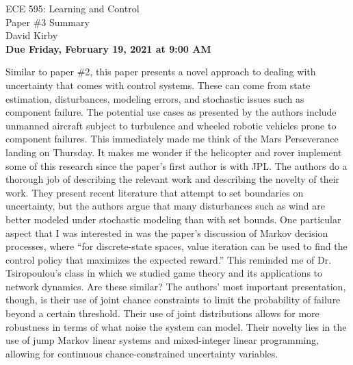 \documentclass[11pt]{article}
\begin{document}
\begin{center}
\LARGE{ECE 595: Learning and Control\\Paper \#3 Summary}\\[1.5em]
\large David Kirby\\[1.5em]
\large \textbf{Due Friday, February 19, 2021 at 9:00 AM}\\[2.5em]
\end{center}

\noindent Similar to paper \#2, this paper presents a novel approach to dealing with uncertainty that comes with control systems. These can come from state estimation, disturbances, modeling errors, and stochastic issues such as component failure. The potential use cases as presented by the authors include unmanned aircraft subject to turbulence and wheeled robotic vehicles prone to component failures. This immediately made me think of the Mars Perseverance landing on Thursday. It makes me wonder if the helicopter and rover implement some of this research since the paper's first author is with JPL. The authors do a thorough job of describing the relevant work and describing the novelty of their work. They present recent literature that attempt to set boundaries on uncertainty, but the authors argue that many disturbances such as wind are better modeled under stochastic modeling than with set bounds. One particular aspect that I was interested in was the paper's discussion of Markov decision processes, where ``for discrete-state spaces, value iteration can be used to find the control policy that maximizes the expected reward.'' This reminded me of Dr. Tsiropoulou's class in which we studied game theory and its applications to network dynamics. Are these similar? The authors' most important presentation, though, is their use of joint chance constraints to limit the probability of failure beyond a certain threshold. Their use of joint distributions allows for more robustness in terms of what noise the system can model. Their novelty lies in the use of jump Markov linear systems and mixed-integer linear programming, allowing for continuous chance-constrained uncertainty variables.
\end{document}
